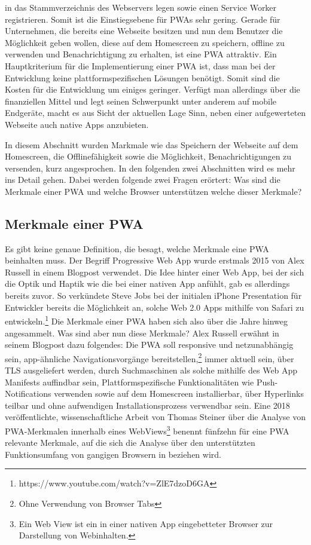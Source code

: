 in das Stammverzeichnis des Webservers legen sowie einen Service Worker registrieren.
Somit ist die Einstiegsebene für PWAs sehr gering. Gerade für Unternehmen,
die bereits eine Webseite besitzen und nun dem Benutzer die Möglichkeit geben wollen,
diese auf dem Homescreen zu speichern, offline zu verwenden und Benachrichtigung zu erhalten,
ist eine PWA attraktiv. Ein Hauptkriterium für die Implementierung einer PWA ist, dass man bei der Entwicklung
keine plattformspezifischen Lösungen benötigt. Somit sind die Kosten für die Entwicklung um einiges
geringer. Verfügt man allerdings über die finanziellen Mittel und legt seinen Schwerpunkt unter anderem
auf mobile Endgeräte, macht es aus Sicht der aktuellen Lage Sinn, neben einer aufgewerteten Webseite
auch native Apps anzubieten.

In diesem Abschnitt wurden Markmale wie das Speichern der Webseite auf dem Homescreen,
die Offlinefähigkeit sowie die Möglichkeit, Benachrichtigungen zu versenden, kurz angesprochen.
In den folgenden zwei Abschnitten wird es mehr ins Detail gehen. Dabei werden folgende
zwei Fragen erörtert: Was sind die Merkmale einer PWA und welche Browser unterstützen
welche dieser Merkmale?

\subsection{Merkmale einer PWA}
\label{subsec:markmaleeinerpwa}
Es gibt keine genaue Definition, die besagt, welche Merkmale eine PWA beinhalten muss.
Der Begriff Progressive Web App wurde erstmals 2015 von Alex Russell in einem Blogpost
verwendet.\cite{PWA2015} Die Idee hinter einer Web App, bei der sich die Optik und Haptik
wie die bei einer nativen App anfühlt, gab es allerdings bereits zuvor. So verkündete
Steve Jobs bei der initialen iPhone Presentation für Entwickler bereits die Möglichkeit
an, solche Web 2.0 Apps mithilfe von Safari zu entwickeln.\footnote{https://www.youtube.com/watch?v=ZlE7dzoD6GA}
Die Merkmale einer PWA haben sich also über die Jahre hinweg angesammelt. Was sind aber
nun diese Merkmale? Alex Russell erwähnt in seinem Blogpost dazu folgendes:
Die PWA soll responsive und netzunabhängig sein, app-ähnliche Navigationsvorgänge bereitstellen,\footnote{Ohne Verwendung von Browser Tabs} 
immer aktuell sein, über TLS ausgeliefert werden, durch Suchmaschinen als solche mithilfe
des Web App Manifests auffindbar sein, Plattformspezifische Funktionalitäten wie Push-Notifications
verwenden sowie auf dem Homescreen installierbar, über Hyperlinks teilbar und ohne aufwendigen
Installationsprozess verwendbar sein.\cite{PWA2015} Eine 2018 veröffentlichte, wissenschaftliche
Arbeit von Thomas Steiner über die Analyse von PWA-Merkmalen innerhalb eines WebViews\footnote{Ein Web View ist ein in einer nativen App eingebetteter Browser zur Darstellung von Webinhalten.}
benennt fünfzehn für eine PWA relevante Merkmale, auf die sich die Analyse über den
unterstützten Funktionsumfang von gangigen Browsern in 
beziehen wird.\cite{WhatIsInAWebView}

